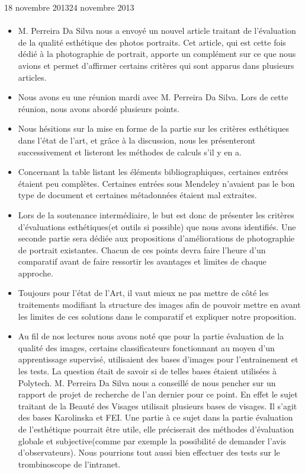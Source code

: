 \documentclass[11pt, french]{report-rd-info}
\begin{document}
\begin{fichesuivi}{18 novembre 2013}{24 novembre 2013}
\paragraph{}
	\begin{echange}
		\begin{itemize}
			\item M. Perreira Da Silva nous a envoyé un nouvel article traitant de l'évaluation de la qualité esthétique des photos portraits. Cet article, qui est cette fois dédié à la photographie de portrait, apporte un complément sur ce que nous avions et permet d'affirmer certains critères qui sont apparus dans plusieurs articles.
			\item Nous avons eu une réunion mardi avec M. Perreira Da Silva. Lors de cette réunion, nous avons abordé plusieurs points.
			\item Nous hésitions sur la mise en forme de la partie sur les critères esthétiques dans l'état de l'art, et grâce à la discussion, nous les présenteront successivement et listeront les méthodes de calculs s'il y en a.
			\item Concernant la table listant les éléments bibliographiques, certaines entrées étaient peu complètes. Certaines entrées sous Mendeley n'avaient pas le bon type de document et certaines métadonnées étaient mal extraites.
			 \item Lors de la soutenance intermédiaire, le but est donc de présenter les critères d'évaluations esthétiques(et outils si possible) que nous avons identifiés. Une seconde partie sera dédiée aux propositions d'améliorations de photographie de portrait existantes. Chacun de ces points devra faire l'heure d'un comparatif avant de faire ressortir les avantages et limites de chaque approche.
			\item Toujours pour l'état de l'Art, il vaut mieux ne pas mettre de côté les traitements modifiant la structure des images afin de pouvoir mettre en avant les limites de ces solutions dans le comparatif et expliquer notre proposition.
			\item Au fil de nos lectures nous avons noté que pour la partie évaluation de la qualité des images, certains classificateurs fonctionnant au moyen d'un apprentissage supervisé, utilisaient des bases d'images pour l'entrainement et les tests. La question était de savoir si de telles bases étaient utilisées à Polytech. M. Perreira Da Silva nous a conseillé de nous pencher sur un rapport de projet de recherche de l'an dernier pour ce point. En effet le sujet traitant de la Beauté des Visages utilisait plusieurs bases de visages. Il s'agit des bases Karolinska et FEI. Une partie à ce sujet dans la partie évaluation de l'esthétique pourrait être utile, elle préciserait des méthodes d'évaluation globale et subjective(comme par exemple la possibilité de demander l'avis d'observateurs). Nous pourrions tout aussi bien effectuer des tests sur le trombinoscope de l'intranet.

\end{itemize}
\end{echange}
\end{fichesuivi}
\end{document}

